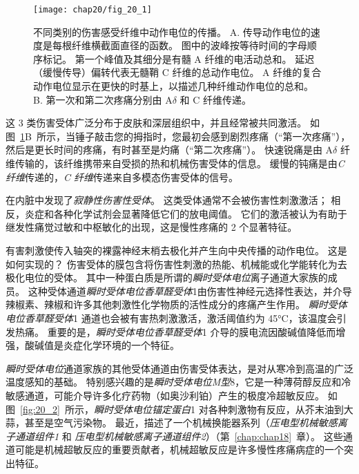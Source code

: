 \begin{figure}[htbp]
	\centering
	\texttt{[image: chap20/fig\_20\_1]}
	\caption{不同类别的伤害感受纤维中动作电位的传播。 
		A. 传导动作电位的速度是每根纤维横截面直径的函数。
		图中的波峰按等待时间的字母顺序标记。
		第一个峰值及其细分是有髓 A 纤维的电活动总和。
		延迟（缓慢传导）偏转代表无髓鞘 C 纤维的总动作电位。
		A 纤维的复合动作电位显示在更快的时基上，以描述几种纤维动作电位的总和\cite{perl2007ideas}。
		B. 第一次和第二次疼痛分别由 A$\delta$ 和 C 纤维传递\cite{fields1987painful}。}
	\label{fig:20_1}
\end{figure}


这 3 类伤害受体广泛分布于皮肤和深层组织中，并且经常被共同激活。
如图~\ref{fig:20_1}B~所示，当锤子敲击您的拇指时，您最初会感到剧烈疼痛（“第一次疼痛”），然后是更长时间的疼痛，有时甚至是灼痛（“第二次疼痛”）。
快速锐痛是由 A$ \delta $ 纤维传输的，该纤维携带来自受损的热和机械伤害受体的信息。
缓慢的钝痛是由\textit{C 纤维}传递的，\textit{C 纤维}传递来自多模态伤害受体的信号。


在内脏中发现了\textit{寂静性伤害性受体}。
这类受体通常不会被伤害性刺激激活；
相反，炎症和各种化学试剂会显著降低它们的放电阈值。
它们的激活被认为有助于继发性痛觉过敏和中枢敏化的出现，这是慢性疼痛的 2 个显著特征。


有害刺激使传入轴突的裸露神经末梢去极化并产生向中央传播的动作电位。
这是如何实现的？
伤害受体的膜包含将伤害性刺激的热能、机械能或化学能转化为去极化电位的受体。
其中一种蛋白质是所谓的\textit{瞬时受体电位}离子通道大家族的成员。
这种受体通道\textit{瞬时受体电位香草醛受体}1由伤害性神经元选择性表达，并介导辣椒素、辣椒和许多其他刺激性化学物质的活性成分的疼痛产生作用。
\textit{瞬时受体电位香草醛受体}1 通道也会被有害热刺激激活，激活阈值约为 45°C，该温度会引发热痛。
重要的是，\textit{瞬时受体电位香草醛受体}1 介导的膜电流因酸碱值降低而增强，酸碱值是炎症化学环境的一个特征。


\textit{瞬时受体电位}通道家族的其他受体通道由伤害受体表达，是对从寒冷到高温的广泛温度感知的基础。
特别感兴趣的是\textit{瞬时受体电位M型}8，它是一种薄荷醇反应和冷敏感通道，可能介导许多化疗药物（如奥沙利铂）产生的极度冷超敏反应。
如图~\ref{fig:20_2}~所示，\textit{瞬时受体电位锚定蛋白}1 对各种刺激物有反应，从芥末油到大蒜，甚至是空气污染物。
最近，描述了一个机械换能器系列（\textit{压电型机械敏感离子通道组件1} 和 \textit{压电型机械敏感离子通道组件2}）（第~\ref{chap:chap18}~章）。
这些通道可能是机械超敏反应的重要贡献者，机械超敏反应是许多慢性疼痛病症的一个突出特征。


